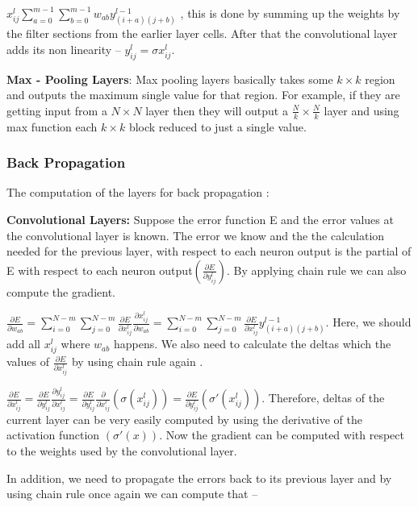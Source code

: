$x_{ij}^{l}\sum_{a=0}^{m-1}\sum_{b=0}^{m-1}w_{ab}y_{(i+a)(j+b)}^{l-1}$ , this is done by summing up the weights by the filter sections from the earlier layer cells. After that the convolutional layer adds its non linearity – 
$y_{ij}^{l} = \sigma x_{ij}^{l}$.

\textbf {Max - Pooling Layers}: 
Max pooling layers basically takes some $k\times  k$ region and outputs the maximum single value for that region. For example, if they are getting input from a $N \times N$ layer then they will output a $ \frac{N}{k} \times \frac{N}{k}$ layer and using max function each $k \times  k$ block reduced to just a single value.

\subsubsection{Back Propagation}
The computation of the layers for back propagation :

\textbf {Convolutional Layers:}
Suppose the error function E and the error values at the convolutional layer is known. The error we know and the the calculation needed for the previous layer, with respect to each neuron output is the partial of E with respect to each neuron output$(\frac{\partial E}{\partial y_{ij}^l})$. By applying chain rule we can also compute the gradient. 

$\frac{\partial E}{\partial w_{ab}} = \sum_{i=0}^{N-m} \sum_{j=0}^{N-m} \frac{\partial E}{\partial x_{ij}^l} \frac{\partial x_{ij}^l}{\partial w_{ab}} = \sum_{i=0}^{N-m} \sum_{j=0}^{N-m} \frac{\partial E}{\partial x_{ij}^l} y_{(i+a)(j+b)}^{l-1}$. Here, we should add all $ x_{ij}^l $ where $ w_{ab}$ happens. We also need to calculate the deltas which the values of ${\frac{\partial E}{\partial x_{ij}^l}}$ by using chain rule again .

$\frac{\partial E}{\partial x_{ij}^l} = \frac{\partial E}{\partial y_{ij}^l} \frac{\partial y_{ij}^l}{\partial x_{ij}^l} =  \frac{\partial E}{\partial y_{ij}^l} \frac{\partial}{\partial x_{ij}^l} (\sigma (x_{ij}^l))= \frac{\partial E}{\partial y_{ij}^l}(\sigma{}' (x_{ij}^l))$. Therefore, deltas of the current layer can be very easily computed by using the derivative of the activation function $(\sigma{}' (x))$. Now the gradient can be computed with respect to the weights used by the convolutional layer. 

In addition, we need to propagate the errors back to its previous layer and by using chain rule once again we can compute that – 

